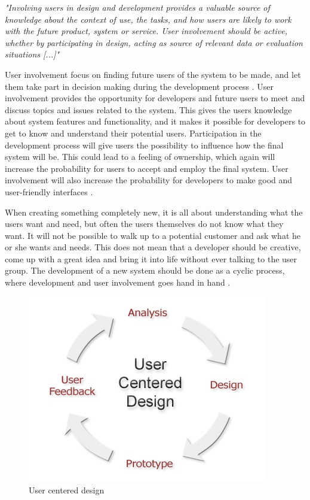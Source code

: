 \emph{"Involving users in design and development provides a valuable source of knowledge about the context of use, the tasks, and how users are likely to work with the future product, system or service. User involvement should be active, whether by participating in design, acting as source of relevant data or evaluation situations [...]"}

User involvement focus on finding future users of the system to be made, and let them take part in decision making during the development process \cite{bjerknes1995user}. User involvement provides the opportunity for developers and future users to meet and discuss topics and issues related to the system. This gives the users knowledge about system features and functionality, and it makes it possible for developers to get to know and understand their potential users. Participation in the development process will give users the possibility to influence how the final system will be. This could lead to a feeling of ownership, which again will increase the probability for users to accept and employ the final system. User involvement will also increase the probability for developers to make good and user-friendly interfaces \cite{infodesign} \cite{mmi}. 

When creating something completely new, it is all about understanding what the users want and need, but often the users themselves do not know what they want. It will not be possible to walk up to a potential customer and ask what he or she wants and needs. This does not mean that a developer should be creative, come up with a great idea and bring it into life without ever talking to the user group. The development of a new system should be done as a cyclic process, where development and user involvement goes hand in hand \cite{mmi}.  

\begin{figure} [ht!]
\centering
\includegraphics[scale=0.8]{userdesign.jpg}
\caption[User centered design]{User centered design \cite{userdesign}}
\label{userdesign}
\end{figure}

